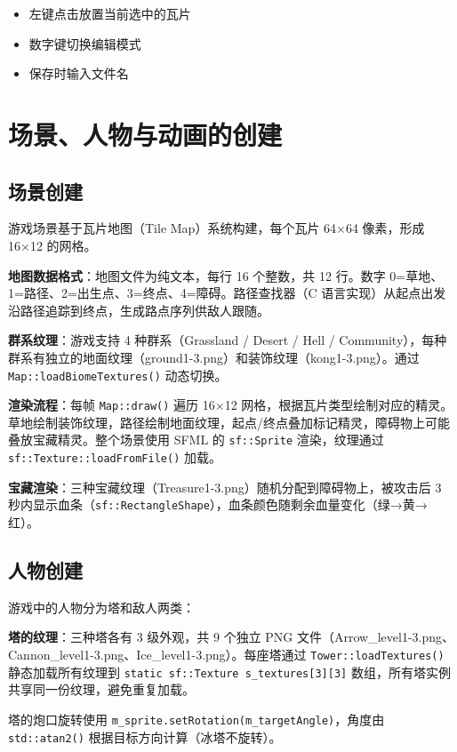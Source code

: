 \documentclass[12pt,a4paper]{ctexart}
\begin{document}
\begin{itemize}
    \item 左键点击放置当前选中的瓦片
    \item 数字键切换编辑模式
    \item 保存时输入文件名
\end{itemize}


\section{场景、人物与动画的创建}

\subsection{场景创建}

游戏场景基于瓦片地图（Tile Map）系统构建，每个瓦片 64×64 像素，形成 16×12 的网格。

\textbf{地图数据格式}：地图文件为纯文本，每行 16 个整数，共 12 行。数字 0=草地、1=路径、2=出生点、3=终点、4=障碍。路径查找器（C 语言实现）从起点出发沿路径追踪到终点，生成路点序列供敌人跟随。

\textbf{群系纹理}：游戏支持 4 种群系（Grassland / Desert / Hell / Community），每种群系有独立的地面纹理（ground1-3.png）和装饰纹理（kong1-3.png）。通过 \texttt{Map::loadBiomeTextures()} 动态切换。

\textbf{渲染流程}：每帧 \texttt{Map::draw()} 遍历 16×12 网格，根据瓦片类型绘制对应的精灵。草地绘制装饰纹理，路径绘制地面纹理，起点/终点叠加标记精灵，障碍物上可能叠放宝藏精灵。整个场景使用 SFML 的 \texttt{sf::Sprite} 渲染，纹理通过 \texttt{sf::Texture::loadFromFile()} 加载。

\textbf{宝藏渲染}：三种宝藏纹理（Treasure1-3.png）随机分配到障碍物上，被攻击后 3 秒内显示血条（\texttt{sf::RectangleShape}），血条颜色随剩余血量变化（绿→黄→红）。

\subsection{人物创建}

游戏中的人物分为塔和敌人两类：

\textbf{塔的纹理}：三种塔各有 3 级外观，共 9 个独立 PNG 文件（Arrow\_level1-3.png、Cannon\_level1-3.png、Ice\_level1-3.png）。每座塔通过 \texttt{Tower::loadTextures()} 静态加载所有纹理到 \texttt{static sf::Texture s\_textures[3][3]} 数组，所有塔实例共享同一份纹理，避免重复加载。

塔的炮口旋转使用 \texttt{m\_sprite.setRotation(m\_targetAngle)}，角度由 \texttt{std::atan2()} 根据目标方向计算（冰塔不旋转）。
\end{document}
